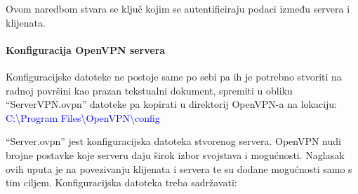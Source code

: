 Ovom naredbom stvara se ključ kojim se autentificiraju podaci između servera i klijenata.
 
\paragraph*{Konfiguracija OpenVPN servera}
\hfill \bigbreak
Konfiguracijske datoteke ne postoje same po sebi pa ih je potrebno stvoriti na radnoj površini kao prazan tekstualni dokument, spremiti u obliku ``ServerVPN.ovpn'' datoteke pa kopirati u direktorij OpenVPN-a na lokaciju:\smallbreak
\small\textcolor{blue}{C:\textbackslash Program Files\textbackslash OpenVPN\textbackslash config}
\smallbreak

``Server.ovpn'' jest konfiguracijska datoteka stvorenog servera. OpenVPN nudi brojne postavke koje serveru daju širok izbor svojstava i mogućnosti. Naglasak ovih uputa je na povezivanju klijenata i servera te su dodane mogućnosti samo s tim ciljem.\smallbreak
Konfiguracijska datoteka treba sadržavati:\smallbreak
